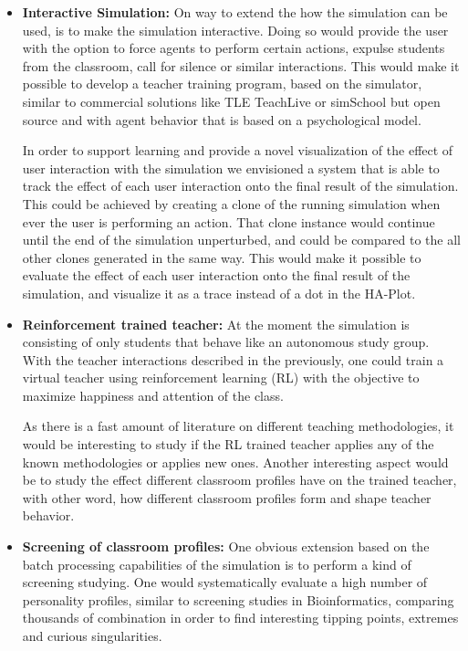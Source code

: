 \begin{itemize}
    \item \textbf{Interactive Simulation:} 
    On way to extend the how the simulation can be used, is to make the simulation
    interactive. Doing so would provide the user with the option to force agents
    to perform certain actions, expulse students from the classroom, call for silence
    or similar interactions. This would make it possible to develop a teacher training 
    program, based on the simulator, similar to commercial solutions like TLE TeachLive
    \cite{Dieker2017} or simSchool \cite{Badiee2015} but open source and with
    agent behavior that is based on a psychological model.
    
    \bb
    
    In order to support learning and provide a novel visualization of the effect
    of user interaction with the simulation we envisioned a system that is able to track
    the effect of each user interaction onto the final result of the simulation.
    This could be achieved by creating a clone of the running simulation when ever
    the user is performing an action. That clone instance would continue until the 
    end of the simulation unperturbed, and could be compared to the all other clones
    generated in the same way. This would make it possible to evaluate the effect
    of each user interaction onto the final result of the simulation, and visualize it
    as a trace instead of a dot in the HA-Plot.

    \item \textbf{Reinforcement trained teacher:} At the moment the simulation
    is consisting of only students that behave like an autonomous study group.
    With the teacher interactions described in the previously, one could train a
    virtual teacher using reinforcement learning (RL) with
    the objective to maximize happiness and attention of the class.
    
    \bb

    As there is a fast amount of literature on different teaching methodologies,
    it would be interesting to study if the RL trained teacher applies any of the known
    methodologies or applies new ones. Another interesting aspect would be to study the
    effect different classroom profiles have on the trained teacher, with other
    word, how different classroom profiles form and shape teacher behavior.

    \item \textbf{Screening of classroom profiles:} One obvious extension based
    on the batch processing capabilities of the simulation is to perform a kind
    of screening studying. One would systematically evaluate a high number of personality
    profiles, similar to screening studies in Bioinformatics, comparing thousands
    of combination in order to find interesting tipping points, extremes and curious
    singularities.


\end{itemize}
